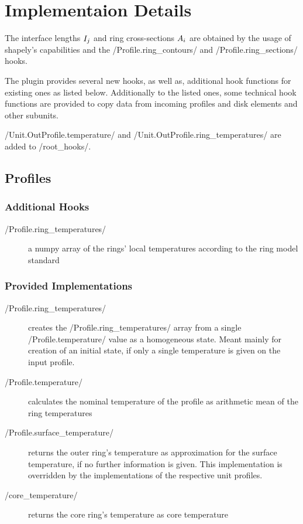 \documentclass{PyRollDocs}
\begin{document}
    \section{Implementaion Details}\label{sec:implementaion-details}

    The interface lengths ${I}_{{j}}$ and ring cross-sections ${A}_{i}$ are obtained by the usage of shapely's capabilities and the \py/Profile.ring_contours/ and \py/Profile.ring_sections/ hooks.

    The plugin provides several new hooks, as well as, additional hook functions for existing ones as listed below.
    Additionally to the listed ones, some technical hook functions are provided to copy data from incoming profiles and disk elements and other subunits.

    \py/Unit.OutProfile.temperature/ and \py/Unit.OutProfile.ring_temperatures/ are added to \py/root_hooks/.

    \subsection{Profiles}

    \subsubsection{Additional Hooks}

    \begin{description}
        \item[\py/Profile.ring_temperatures/] a numpy array of the rings' local temperatures according to the ring model standard
    \end{description}

    \subsubsection{Provided Implementations}

    \begin{description}
        \item[\py/Profile.ring_temperatures/] creates the \py/Profile.ring_temperatures/ array from a single \py/Profile.temperature/ value as a homogeneous state.
        Meant mainly for creation of an initial state, if only a single temperature is given on the input profile.
        \item[\py/Profile.temperature/] calculates the nominal temperature of the profile as arithmetic mean of the ring temperatures
        \item[\py/Profile.surface_temperature/] returns the outer ring's temperature as approximation for the surface temperature, if no further information is given.
        This implementation is overridden by the implementations of the respective unit profiles.
        \item[\py/core_temperature/] returns the core ring's temperature as core temperature
    \end{description}
\end{document}

